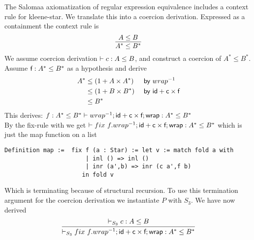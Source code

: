 \documentclass[a4paper,UKenglish,cleveref, autoref, thm-restate]{lipics-v2021}
\begin{document}
\begin{example}[Salomaa]\label{ex:map}
The Salomaa axiomatization of regular expression equivalence includes a context rule for kleene-star. We translate this into a coercion derivation. Expressed as a containment the context rule is
\[ \infer{A^* \leq B^*}{A\leq B} \]
We assume coercion derivation $\contains{}{c}{A}{B}$, and construct a coercion of $ A^* \leq B^*$.\\
Assume $\textsf{f}: A^* \leq B^*$ as a hypothesis and derive
\begin{align}
  A^* &\leq (1 + A \times A^*) && \textsf{ by} ~\dslcominv{wrap}\\
&\leq  (1 + B \times B^*) &&\textsf{ by} ~\dslcom{id}+ \dslcom{c} \times \dslcom{f}\\
&\leq B^*
\end{align}
This derives:
$\contains{f : A^* \leq B^*}{\dslcominv{wrap} ; \dslcom{id} + \dslcom{c} \times \dslcom{f};  \dslcom{wrap}}{A^*}{B^*}$\\
By the fix-rule with %
we get $\contains{}{\fix~f. \dslcominv{wrap} ; \dslcom{id} + \dslcom{c} \times \dslcom{f};  \dslcom{wrap}}{A^*}{B^*}$ which is just the map function on a list 
\begin{verbatim}
Definition map :=  fix f (a : Star) := let v := match fold a with 
                       | inl () => inl ()
                       | inr (a',b) => inr (c a',f b)
                      in fold v
\end{verbatim}
Which is terminating because of structural recursion. To use this termination argument for the coercion derivation we instantiate $P$ with $S_3$. We have now derived
\[\infer{\containsP{}{\fix~f. \dslcominv{wrap} ; \dslcom{id} + \dslcom{c} \times \dslcom{f};  \dslcom{wrap}}{A^*}{B^*}{S_3}}{\containsP{}{c}{A}{B}{S_3}}\]
\end{example}
\end{document}
